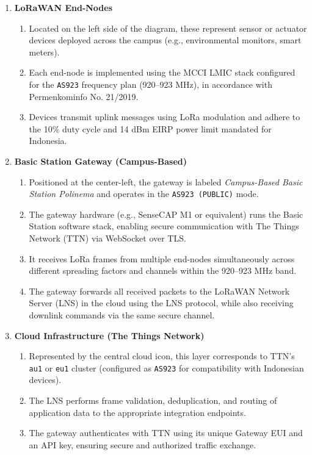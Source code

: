 \begin{enumerate}
    \item \textbf{LoRaWAN End-Nodes}
          \begin{enumerate}
              \item Located on the left side of the diagram, these represent sensor or actuator devices deployed across the campus (e.g., environmental monitors, smart meters).
              \item Each end-node is implemented using the MCCI LMIC stack configured for the \texttt{AS923} frequency plan (920–923 MHz), in accordance with Permenkominfo No. 21/2019.
              \item Devices transmit uplink messages using LoRa modulation and adhere to the 10\% duty cycle and 14 dBm EIRP power limit mandated for Indonesia.
          \end{enumerate}

    \item \textbf{Basic Station Gateway (Campus-Based)}
          \begin{enumerate}
              \item Positioned at the center-left, the gateway is labeled \textit{Campus-Based Basic Station Polinema} and operates in the \texttt{AS923 (PUBLIC)} mode.
              \item The gateway hardware (e.g., SenseCAP M1 or equivalent) runs the Basic Station software stack, enabling secure communication with The Things Network (TTN) via WebSocket over TLS.
              \item It receives LoRa frames from multiple end-nodes simultaneously across different spreading factors and channels within the 920–923 MHz band.
              \item The gateway forwards all received packets to the LoRaWAN Network Server (LNS) in the cloud using the LNS protocol, while also receiving downlink commands via the same secure channel.
          \end{enumerate}

    \item \textbf{Cloud Infrastructure (The Things Network)}
          \begin{enumerate}
              \item Represented by the central cloud icon, this layer corresponds to TTN’s \texttt{au1} or \texttt{eu1} cluster (configured as \texttt{AS923} for compatibility with Indonesian devices).
              \item The LNS performs frame validation, deduplication, and routing of application data to the appropriate integration endpoints.
              \item The gateway authenticates with TTN using its unique Gateway EUI and an API key, ensuring secure and authorized traffic exchange.
          \end{enumerate}


\end{enumerate}
